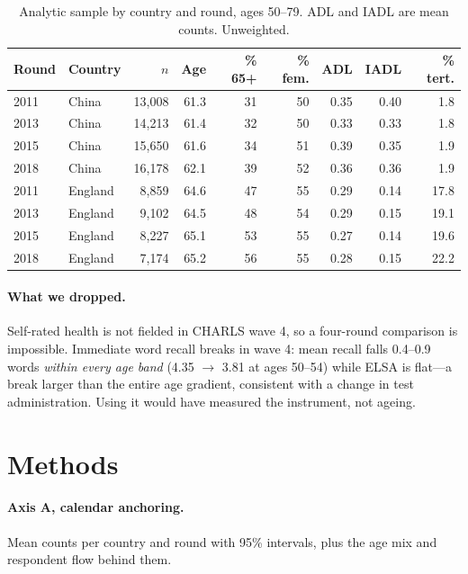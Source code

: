 \documentclass[runningheads]{llncs}
\begin{document}
\begin{table}[!htbp]
\caption{Analytic sample by country and round, ages 50--79. ADL and IADL are mean counts. Unweighted.}
\label{tab:sample}
\centering
\scriptsize
\setlength{\tabcolsep}{3pt}
\begin{tabular}{llrrrrrrr}
\toprule
Round & Country & $n$ & Age & \% 65+ & \% fem. & ADL & IADL & \% tert. \\
\midrule
2011 & China   & 13,008 & 61.3 & 31 & 50 & 0.35 & 0.40 & 1.8 \\
2013 & China   & 14,213 & 61.4 & 32 & 50 & 0.33 & 0.33 & 1.8 \\
2015 & China   & 15,650 & 61.6 & 34 & 51 & 0.39 & 0.35 & 1.9 \\
2018 & China   & 16,178 & 62.1 & 39 & 52 & 0.36 & 0.36 & 1.9 \\
2011 & England &  8,859 & 64.6 & 47 & 55 & 0.29 & 0.14 & 17.8 \\
2013 & England &  9,102 & 64.5 & 48 & 54 & 0.29 & 0.15 & 19.1 \\
2015 & England &  8,227 & 65.1 & 53 & 55 & 0.27 & 0.14 & 19.6 \\
2018 & England &  7,174 & 65.2 & 56 & 55 & 0.28 & 0.15 & 22.2 \\
\bottomrule
\end{tabular}
\end{table}

\paragraph{What we dropped.} Self-rated health is not fielded in CHARLS wave 4, so a four-round comparison is impossible. Immediate word recall breaks in wave 4: mean recall falls 0.4--0.9 words \emph{within every age band} (4.35 $\rightarrow$ 3.81 at ages 50--54) while ELSA is flat---a break larger than the entire age gradient, consistent with a change in test administration. Using it would have measured the instrument, not ageing.

\section{Methods}

\paragraph{Axis A, calendar anchoring.} Mean counts per country and round with 95\% intervals, plus the age mix and respondent flow behind them.
\end{document}
